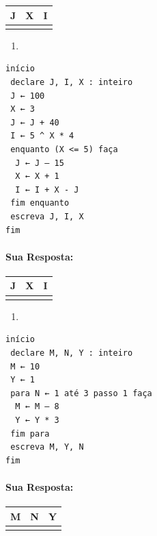 \documentclass[12pt,a4paper]{article}
\providecommand{\tightlist}{%
      \setlength{\itemsep}{0pt}\setlength{\parskip}{0pt}}
\begin{document}
\begin{longtable}[]{@{}ccc@{}}
\toprule()
J & X & I \\
\midrule()
\endhead
& & \\
\bottomrule()
\end{longtable}

    \begin{enumerate}
\def\labelenumi{\alph{enumi})}
\setcounter{enumi}{2}
\tightlist
\item
\end{enumerate}

\begin{verbatim}
início
 declare J, I, X : inteiro
 J ← 100
 X ← 3
 J ← J + 40
 I ← 5 ^ X * 4
 enquanto (X <= 5) faça
  J ← J – 15
  X ← X + 1
  I ← I + X - J
 fim enquanto
 escreva J, I, X
fim 
\end{verbatim}

    \hypertarget{sua-resposta}{%
\paragraph{Sua Resposta:}\label{sua-resposta}}

\begin{longtable}[]{@{}ccc@{}}
\toprule()
J & X & I \\
\midrule()
\endhead
& & \\
\bottomrule()
\end{longtable}

    \begin{enumerate}
\def\labelenumi{\alph{enumi})}
\setcounter{enumi}{3}
\tightlist
\item
\end{enumerate}

\begin{verbatim}
início
 declare M, N, Y : inteiro
 M ← 10
 Y ← 1
 para N ← 1 até 3 passo 1 faça
  M ← M – 8
  Y ← Y * 3
 fim para
 escreva M, Y, N
fim 
\end{verbatim}

    \hypertarget{sua-resposta}{%
\paragraph{Sua Resposta:}\label{sua-resposta}}

\begin{longtable}[]{@{}ccc@{}}
\toprule()
M & N & Y \\
\midrule()
\endhead
& & \\
\bottomrule()
\end{longtable}
\end{document}
